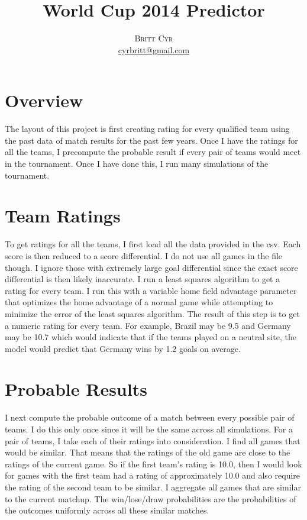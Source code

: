 \documentclass[twoside]{article}
\title{\vspace{-15mm}\fontsize{24pt}{10pt}\selectfont\textbf{World Cup 2014 Predictor}} %
\author{
\large
\textsc{Britt Cyr}
\\ %
\normalsize \href{mailto:cyrbritt@gmail.com}{cyrbritt@gmail.com} %
\vspace{-5mm}
}
\date{}
\begin{document}
\maketitle %


\begin{multicols}{2} %



\section{Overview}
The layout of this project is first creating rating for every qualified team
using the past data of match results for the past few years. Once I have the ratings for
all the teams, I precompute the probable result if every pair of teams would meet in
the tournament. Once I have done this, I run many simulations of the tournament.

\section{Team Ratings}
To get ratings for all the teams, I first load all the data provided in the csv. Each
score is then reduced to a score differential. 
I do not use all games in the file though. I ignore those with extremely large goal
differential since the exact score differential is then likely inaccurate.
I run a least squares algorithm to 
get a rating for every team. I run this with a variable home field advantage parameter
that optimizes the home advantage of a normal game while attempting to minimize the
error of the least squares algorithm. The result of this step is to get a numeric rating
for every team. For example, Brazil may be 9.5 and Germany may be 10.7 which would indicate
that if the teams played on a neutral site, the model would predict that Germany wins
by 1.2 goals on average.

\section{Probable Results}
I next compute the probable outcome of a match between every possible pair of teams.
I do this only once since it will be the same across all simulations. For a pair of teams,
I take each of their ratings into consideration. I find all games that would be similar. That
means that the ratings of the old game are close to the ratings of the current game. So
if the first team's rating is 10.0, then I would look for games with the first team had a
rating of approximately 10.0 and also require the rating of the second team to be similar.
I aggregate all games that are similar to the current matchup. The 
win/lose/draw probabilities are the
probabilities of the outcomes uniformly across all these similar matches.


\end{multicols}
\end{document}
